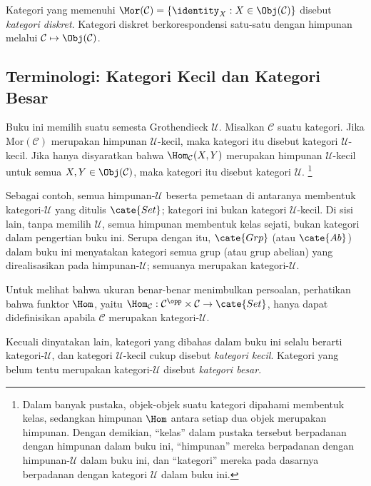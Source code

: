 Kategori yang memenuhi
$\Mor(\mathcal{C}) = \left\{ \identity_X : X \in \Obj(\mathcal{C}) \right\}$
disebut \emph{kategori diskret}. Kategori diskret berkorespondensi satu-satu
dengan himpunan melalui $\mathcal{C} \mapsto \Obj(\mathcal{C})$.

\subsection*{Terminologi: Kategori Kecil dan Kategori Besar}

Buku ini memilih suatu semesta Grothendieck $\mathcal{U}$. Misalkan
$\mathcal{C}$ suatu kategori. Jika $\mathrm{Mor}(\mathcal{C})$ merupakan
himpunan $\mathcal{U}$-kecil, maka kategori itu disebut kategori
$\mathcal{U}$-kecil. Jika hanya disyaratkan bahwa $\Hom_{\mathcal{C}}(X, Y)$
merupakan himpunan $\mathcal{U}$-kecil untuk semua
$X, Y \in \Obj(\mathcal{C})$, maka kategori itu disebut kategori
$\mathcal{U}$.
\footnote{Dalam banyak pustaka, objek-objek suatu kategori dipahami membentuk
kelas, sedangkan himpunan $\Hom$ antara setiap dua objek merupakan himpunan.
Dengan demikian, ``kelas'' dalam pustaka tersebut berpadanan dengan himpunan
dalam buku ini, ``himpunan'' mereka berpadanan dengan himpunan-$\mathcal{U}$
dalam buku ini, dan ``kategori'' mereka pada dasarnya berpadanan dengan
kategori $\mathcal{U}$ dalam buku ini.}

Sebagai contoh, semua himpunan-$\mathcal{U}$ beserta pemetaan di antaranya
membentuk kategori-$\mathcal{U}$ yang ditulis $\cate{Set}$; kategori ini bukan
kategori $\mathcal{U}$-kecil. Di sisi lain, tanpa memilih $\mathcal{U}$,
semua himpunan membentuk kelas sejati, bukan kategori dalam pengertian buku ini.
Serupa dengan itu, $\cate{Grp}$ (atau $\cate{Ab}$) dalam buku ini menyatakan
kategori semua grup (atau grup abelian) yang direalisasikan pada
himpunan-$\mathcal{U}$; semuanya merupakan kategori-$\mathcal{U}$.

Untuk melihat bahwa ukuran benar-benar menimbulkan persoalan, perhatikan bahwa
funktor $\Hom$, yaitu
$\Hom_{\mathcal{C}}: \mathcal{C}^{\opp} \times \mathcal{C} \to \cate{Set}$,
hanya dapat didefinisikan apabila $\mathcal{C}$ merupakan kategori-$\mathcal{U}$.

Kecuali dinyatakan lain, kategori yang dibahas dalam buku ini selalu berarti
kategori-$\mathcal{U}$, dan kategori $\mathcal{U}$-kecil cukup disebut
\emph{kategori kecil}. Kategori yang belum tentu merupakan kategori-$\mathcal{U}$
disebut \emph{kategori besar}.

